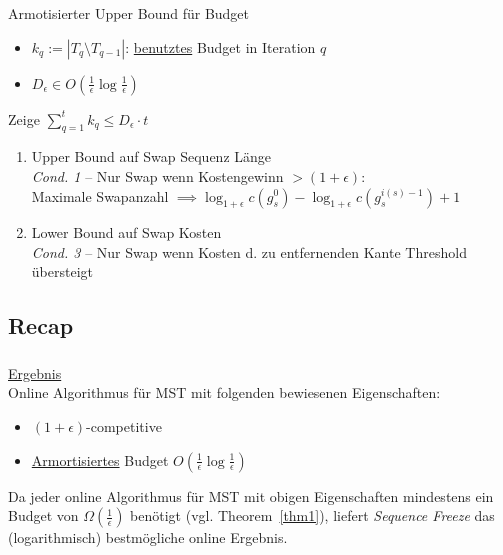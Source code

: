 \begin{frame}
    \frametitle{\insertsubsection}
    Armotisierter Upper Bound für Budget
    \vspace{.5em}
    \begin{itemize}
        \itemsep\setlength{.5em}
        \item $k_q := |T_q \setminus T_{q-1}|$: \underline{benutztes} Budget in Iteration $q$
        \item $D_\epsilon \in O(\frac{1}{\epsilon}\log\frac{1}{\epsilon})$
    \end{itemize}
    \vspace{.5em}
    \begin{block}{Zeige $\sum_{q=1}^t k_q \leq D_\epsilon \cdot t$}
        \vspace{.5em}
        \begin{enumerate}
            \itemsep\setlength{.8em}
            \item Upper Bound auf Swap Sequenz Länge\\
            \emph{Cond. 1} -- Nur Swap wenn Kostengewinn $> (1+\epsilon)$:\\Maximale Swapanzahl $\implies \log_{1+\epsilon}c(g_s^0) - \log_{1+\epsilon}c(g_s^{i(s)-1}) + 1$
            \item Lower Bound auf Swap Kosten\\
            \emph{Cond. 3} -- Nur Swap wenn Kosten d. zu entfernenden Kante Threshold übersteigt
        \end{enumerate}
        \vspace{.1em}
    \end{block}
\end{frame}

\subsection{Recap}
\begin{frame}
    \frametitle{\insertsection}
    \underline{Ergebnis}\\
    \vspace{1em}
    Online Algorithmus für MST mit folgenden bewiesenen Eigenschaften:\\
    \vspace{1em}
    \begin{itemize}
        \itemsep\setlength{.8em}
        \item $(1+\epsilon)$-competitive
        \item \underline{Armortisiertes} Budget $O(\frac{1}{\epsilon}\log\frac{1}{\epsilon})$
    \end{itemize}
    \vspace{1em}
    Da jeder online Algorithmus für MST mit obigen Eigenschaften mindestens ein Budget von $\Omega(\frac{1}{\epsilon})$ benötigt (vgl. Theorem~\ref{thm1}), liefert \emph{Sequence Freeze} das (logarithmisch) bestmögliche online Ergebnis.
\end{frame}